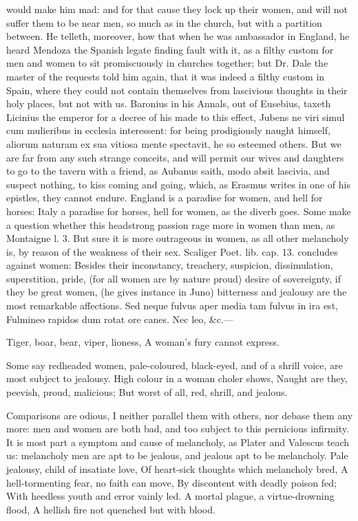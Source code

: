 {would make him mad: and for that cause they lock up their women, and
will not suffer them to be near men, so much as in the church,
but with a partition between. He telleth, moreover, how that when he
was ambassador in England, he heard Mendoza the Spanish legate finding
fault with it, as a filthy custom for men and women to sit
promiscuously in churches together; but Dr. Dale the master of the
requests told him again, that it was indeed a filthy custom in Spain,
where they could not contain themselves from lascivious thoughts in
their holy places, but not with us. Baronius in his Annals, out of
Eusebius, taxeth Licinius the emperor for a decree of his made to this
effect, Jubens ne viri simul cum mulieribus in ecclesia interessent:
for being prodigiously naught himself, aliorum naturam ex sua vitiosa
mente spectavit, he so esteemed others. But we are far from any such
strange conceits, and will permit our wives and daughters to go to the
tavern with a friend, as Aubanus saith, modo absit lascivia, and
suspect nothing, to kiss coming and going, which, as Erasmus writes in
one of his epistles, they cannot endure. England is a paradise for
women, and hell for horses: Italy a paradise for horses, hell for
women, as the diverb goes. Some make a question whether this headstrong
passion rage more in women than men, as Montaigne l. 3. But sure it is
more outrageous in women, as all other melancholy is, by reason of the
weakness of their sex. Scaliger Poet. lib. cap. 13. concludes against
women: Besides their inconstancy, treachery, suspicion,
dissimulation, superstition, pride, (for all women are by nature proud)
desire of sovereignty, if they be great women, (he gives instance in
Juno) bitterness and jealousy are the most remarkable affections.
Sed neque fulvus aper media tam fulvus in ira est,
Fulmineo rapidos dum rotat ore canes.
Nec leo, \&c.---

Tiger, boar, bear, viper, lioness,
A woman's fury cannot express.

Some say redheaded women, pale-coloured, black-eyed, and of a
shrill voice, are most subject to jealousy.
High colour in a woman choler shows,
Naught are they, peevish, proud, malicious;
But worst of all, red, shrill, and jealous.

Comparisons are odious, I neither parallel them with others, nor debase
them any more: men and women are both bad, and too subject to this
pernicious infirmity. It is most part a symptom and cause of
melancholy, as Plater and Valescus teach us: melancholy men are apt to
be jealous, and jealous apt to be melancholy.
Pale jealousy, child of insatiate love,
Of heart-sick thoughts which melancholy bred,
A hell-tormenting fear, no faith can move,
By discontent with deadly poison fed;
With heedless youth and error vainly led.
A mortal plague, a virtue-drowning flood,
A hellish fire not quenched but with blood.

}
